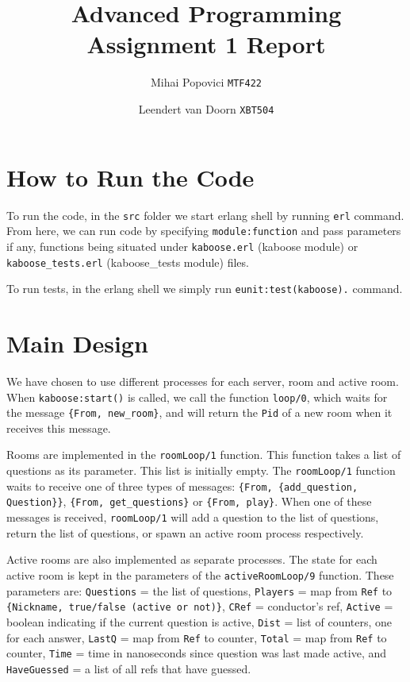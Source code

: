 \documentclass{article}
\title{Advanced Programming Assignment 1 Report}
\author{Mihai Popovici \texttt{MTF422} \and Leendert van Doorn \texttt{XBT504}}
\begin{document}
\maketitle	

\section{How to Run the Code}
To run the code, in the \texttt{src} folder we start erlang shell by running \texttt{erl} command. From here, we can run code by specifying \texttt{module:function} and pass parameters if any, functions being situated under \texttt{kaboose.erl} (kaboose module) or \texttt{kaboose\_tests.erl} (kaboose\_tests module) files.

To run tests, in the erlang shell we simply run \texttt{eunit:test(kaboose).} command.

\section{Main Design}
We have chosen to use different processes for each server, room and active room. When \texttt{kaboose:start()} is called, we call the function \texttt{loop/0}, which waits for the message \texttt{\{From, new\_room\}}, and will return the \texttt{Pid} of a new room when it receives this message.

Rooms are implemented in the \texttt{roomLoop/1} function. This function takes a list of questions as its parameter. This list is initially empty. The \texttt{roomLoop/1} function waits to receive one of three types of messages: \texttt{\{From, \{add\_question, Question\}\}}, \texttt{\{From, get\_questions\}} or \texttt{\{From, play\}}. When one of these messages is received, \texttt{roomLoop/1} will add a question to the list of questions, return the list of questions, or spawn an active room process respectively.

Active rooms are also implemented as separate processes. The state for each active room is kept in the parameters of the \texttt{activeRoomLoop/9} function. These parameters are: \texttt{Questions} = the list of questions, \texttt{Players} = map from \texttt{Ref} to \texttt{\{Nickname, true/false (active or not)\}}, \texttt{CRef} = conductor's ref, \texttt{Active} = boolean indicating if the current question is active, \texttt{Dist} = list of counters, one for each answer, \texttt{LastQ} = map from \texttt{Ref} to counter, \texttt{Total} = map from \texttt{Ref} to counter, \texttt{Time} = time in nanoseconds since question was last made active, and \texttt{HaveGuessed} = a list of all refs that have guessed.
\end{document}
